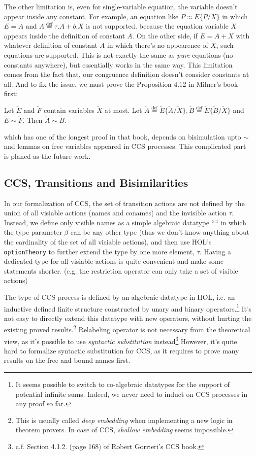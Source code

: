 The other limitation is, even for single-variable equation, the
variable doesn't appear inside any constant.  For example, an equation like
$P \approx E\{P/X\}$ in which $E = A$ and $A \overset{\mathrm{def}}{=}
\tau.A + b.X$ is not supported, because the equation variable $X$
appears inside the definition of constant $A$. On the other side, if
$E = A + X$ with whatever definition of constant $A$ in which there's
no appearence of $X$, such equations are supported. This is not
exactly the same as \emph{pure} equations (no constants anywhere), but
essentially works in the same way. This limitation comes from the fact
that, our congruence definition doesn't consider constants at all.
And to fix the issue, we must prove the Proposition 4.12 in Milner's
book first:
\begin{proposition}
Let $\tilde{E}$ and $\tilde{F}$ contain variables $\tilde{X}$ at
most. Let
$\tilde{A}\overset{\mathrm{def}}{=}\tilde{E}\{\tilde{A}/\tilde{X}\},
\tilde{B}\overset{\mathrm{def}}{=}\tilde{E}\{\tilde{B}/\tilde{X}\}$
and $\tilde{E}\sim\tilde{F}$. Then $\tilde{A}\sim\tilde{B}$.
\end{proposition}
which has one of the longest proof in that book, depends on bisimulation upto
$\sim$ and lemmas on free variables appeared in CCS
processes. This complicated part is planed as the future work.

\subsection{CCS, Transitions and Bisimilarities}

In our formalization of CCS, the set of transition actions are not
defined by the union of all visiable actions (names and conames) and the invisible
action $\tau$. Instead, we define only visible names as a simple
algebraic datatype ```` in which the type parameter
$\beta$ can be any other type (thus we don't know anything about the
cardinality of the set of all visiable actions), and then use HOL's
\texttt{optionTheory} to further extend the type by one more
element, $\tau$. Having a dedicated type for all visiable actions is quite
convenient and make some statements shorter. (e.g. the restriction
operator can only take a set of visible actions)

The type of CCS process is defined by an algebraic datatype in HOL,
i.e. an inductive defined finite structure constructed by unary and
binary operators.\footnote{It seems possible to switch to co-algebraic
datatypes for the support of potential infinite sums. Indeed, we never
need to induct on CCS processes in any proof so far.} 
It's not easy to directly extend this datatype with new operators,
without hurting the existing proved results.\footnote{This is usually
  called \emph{deep embedding} when implementing a new logic in theorem
  provers. In case of CCS, \emph{shallow embedding} seems impossible.}
Relabeling operator is not necessary from the theoretical view, as
it's possible to use \emph{syntactic
  substitution} instead\footnote{c.f. Section 4.1.2. (page 168) of Robert Gorrieri's CCS book.}
However, it's quite hard to formalize syntactic substitution for CCS,
as it requires to prove many results on the free and bound names
first.

